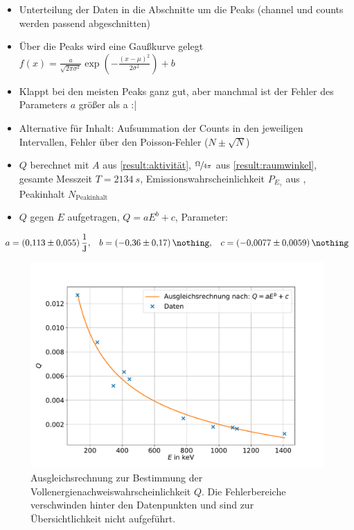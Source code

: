 \begin{itemize}
	\item Unterteilung der Daten in die Abschnitte um die Peaks (channel und counts werden passend abgeschnitten)
	\item Über die Peaks wird eine Gaußkurve gelegt $f (x) = \frac{a}{\sqrt{2 \pi \sigma^2}} \exp{\left( - \frac{(x-\mu)^2}{2 \sigma^2} \right)}+b$
	\item Klappt bei den meisten Peaks ganz gut, aber manchmal ist der Fehler des Parameters $a$ größer als a :|
	\item Alternative für Inhalt: Aufsummation der Counts in den jeweiligen Intervallen, Fehler über den Poisson-Fehler ($N \pm \sqrt{N}$)
	\item $Q$ berechnet mit $A$ aus \eqref{result:aktivität}, $\sfrac{\Omega}{4 \pi}$ aus \eqref{result:raumwinkel},
	gesamte Messzeit $T=\SI{2134}{s}$, Emissionswahrscheinlichkeit $P_{E_{\gamma}}$ aus \cite{nucleide}, Peakinhalt $N_{\text{Peakinhalt}}$
	\item $Q$ gegen $E$ aufgetragen, $Q=a E^{b} + c$, Parameter:
\end{itemize}
\begin{align*}
	a = \SI{0.113 (55)}{\frac{1}{J}}, && b = \SI{-0.36 (17)}{\nothing}, && c = \SI{-0.0077 (59)}{\nothing}
\end{align*}

\begin{figure}[h!]
  \centering
  \includegraphics[width=\textwidth]{content/images/vollenergienachweiswahrscheinlichkeit.pdf}
  \caption{Ausgleichsrechnung zur Bestimmung der Vollenergienachweiswahrscheinlichkeit $Q$.
  Die Fehlerbereiche verschwinden hinter den Datenpunkten und sind zur Übersichtlichkeit nicht aufgeführt.}
  \label{fig:vw}
\end{figure}


